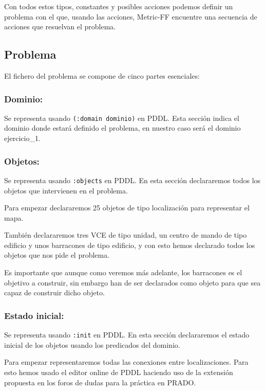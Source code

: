 \documentclass[10pt, spanish]{article}
\begin{document}
Con todos estos tipos, constantes y posibles acciones podemos definir un problema con el que, usando las acciones, Metric-FF encuentre una secuencia de acciones que resuelvan el problema.

\subsection{Problema}

El fichero del problema se compone de cinco partes esenciales:

\subsubsection{Dominio:}

Se representa usando \texttt{(:domain dominio)} en PDDL. Esta sección indica el dominio donde estará definido el problema, en nuestro caso será el dominio ejercicio\_1.

\subsubsection{Objetos:}

Se representa usando \texttt{:objects} en PDDL. En esta sección declararemos todos los objetos que intervienen en el problema.

Para empezar declararemos 25 objetos de tipo localización para representar el mapa.

También declararemos tres VCE de tipo unidad, un centro de mando de tipo edificio y unos barracones de tipo edificio, y con esto hemos declarado todos los objetos que nos pide el problema.

Es importante que aunque como veremos más adelante, los barracones es el objetivo a construir, sin embargo han de ser declarados como objeto para que sea capaz de construir dicho objeto.


\subsubsection{Estado inicial:}

Se representa usando \texttt{:init} en PDDL. En esta sección declararemos el estado inicial de los objetos usando los predicados del dominio.

Para empezar representaremos todas las conexiones entre localizaciones. Para esto hemos usado el editor online de PDDL haciendo uso de la extensión propuesta en los foros de dudas para la práctica en PRADO.
\end{document}
